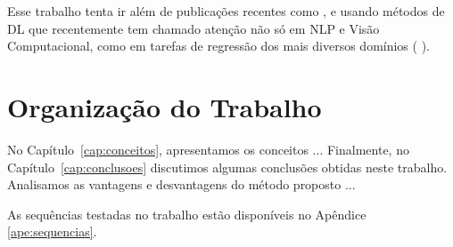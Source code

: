 Esse trabalho tenta ir além de publicações recentes como \citet{cementnn1}, \citet{cementnn2} e \citet{cementml} usando métodos de DL que recentemente tem chamado atenção não só em NLP e Visão Computacional, como em tarefas de regressão dos mais diversos domínios (\cite{ubertime} \cite{lstmbr} \cite{energylstm}). 

\section{Organização do Trabalho}
\label{sec:organizacao_trabalho}

No Capítulo~\ref{cap:conceitos}, apresentamos os conceitos ... Finalmente, no
Capítulo~\ref{cap:conclusoes} discutimos algumas conclusões obtidas neste
trabalho. Analisamos as vantagens e desvantagens do método proposto ... 

As sequências testadas no trabalho estão disponíveis no Apêndice \ref{ape:sequencias}.


